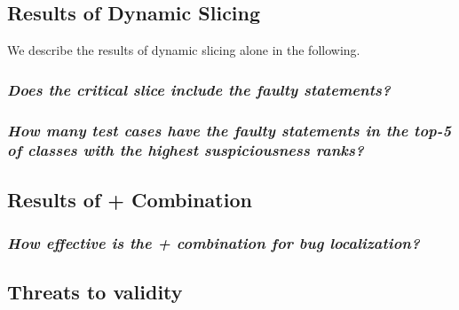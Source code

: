 \documentclass[sigplan,10pt,review,anonymous]{acmart}\settopmatter{printfolios=true,printccs=false,printacmref=false}
\begin{document}


\subsection{Results of Dynamic Slicing}

We describe the results of dynamic slicing alone in the following.



\subsubsection{\textit{Does the critical slice include the faulty statements?}}



\subsubsection{\textit{How many test cases have the faulty statements in the top-5 of classes with the highest suspiciousness ranks?}}



\subsection{Results of \sfl{}+\ds{} Combination}

\subsubsection{\textit{How effective is the \sfl{}+\ds{} combination for bug localization?}}

\subsection{Threats to validity}

\pagebreak
\end{document}
